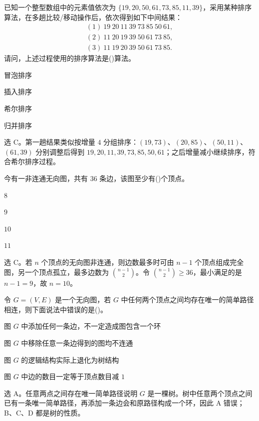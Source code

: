 \begin{question}
已知一个整型数组中的元素值依次为 $\{19,20,50,61,73,85,11,39\}$，采用某种排序算法，在多趟比较/移动操作后，依次得到如下中间结果：
\[
\begin{array}{l}
(1)\ 19\ 20\ 11\ 39\ 73\ 85\ 50\ 61,\\
(2)\ 11\ 20\ 19\ 39\ 50\ 61\ 73\ 85,\\
(3)\ 11\ 19\ 20\ 39\ 50\ 61\ 73\ 85.
\end{array}
\]
请问，上述过程使用的排序算法是(\quad)算法。
\begin{choiceoptions}[4]
  \item 冒泡排序
  \item 插入排序
  \item 希尔排序
  \item 归并排序
\end{choiceoptions}
\begin{solution}
选 C。第一趟结果类似按增量 $4$ 分组排序：$(19,73)$、$(20,85)$、$(50,11)$、$(61,39)$ 分别调整后得到 $19,20,11,39,73,85,50,61$；之后增量减小继续排序，符合希尔排序过程。
\end{solution}
\end{question}

\begin{question}
今有一非连通无向图，共有 $36$ 条边，该图至少有(\quad)个顶点。
\begin{choiceoptions}[4]
  \item $8$
  \item $9$
  \item $10$
  \item $11$
\end{choiceoptions}
\begin{solution}
选 C。若 $n$ 个顶点的无向图非连通，则边数最多时可由 $n-1$ 个顶点组成完全图，另一个顶点孤立，最多边数为 $\binom{n-1}{2}$。令 $\binom{n-1}{2}\ge 36$，最小满足的是 $n-1=9$，故 $n=10$。
\end{solution}
\end{question}

\begin{question}
令 $G=(V,E)$ 是一个无向图，若 $G$ 中任何两个顶点之间均存在唯一的简单路径相连，则下面说法中错误的是(\quad)。
\begin{choiceoptions}[1]
  \item 图 $G$ 中添加任何一条边，不一定造成图包含一个环
  \item 图 $G$ 中移除任意一条边得到的图均不连通
  \item 图 $G$ 的逻辑结构实际上退化为树结构
  \item 图 $G$ 中边的数目一定等于顶点数目减 $1$
\end{choiceoptions}
\begin{solution}
选 A。任意两点之间存在唯一简单路径说明 $G$ 是一棵树。树中任意两个顶点之间已有一条唯一简单路径，再添加一条边会和原路径构成一个环，因此 A 错误；B、C、D 都是树的性质。
\end{solution}
\end{question}

